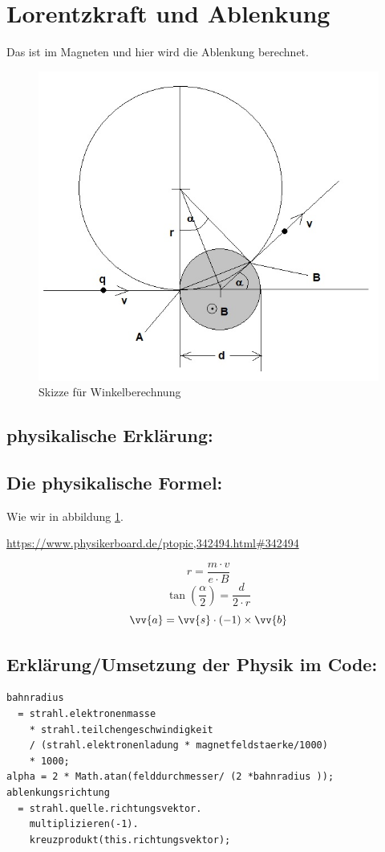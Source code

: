 \section{Lorentzkraft und Ablenkung}

Das ist im Magneten und hier wird die Ablenkung berechnet.
\begin{figure}
    \centering
    \includegraphics[width=.75\textwidth]{fig/elektronenstrahl-ablenkung_101.jpg}
    \caption{Skizze für Winkelberechnung}
    \label{fig:ausBlock}
\end{figure}

\subsection{physikalische Erklärung:}
\subsection{Die physikalische Formel:}
Wie wir in abbildung \ref{fig:ausBlock}.

\url{https://www.physikerboard.de/ptopic,342494.html#342494}

$$ r = \frac{m \cdot v}{e \cdot B}$$
$$ \tan(\frac{\alpha}{2}) = \frac{d}{2 \cdot r}$$
$$ \vv{a} = \vv{s} \cdot (-1) \times \vv{b}$$

\subsection{Erklärung/Umsetzung der Physik im Code:}
\begin{lstlisting}
bahnradius
  = strahl.elektronenmasse
    * strahl.teilchengeschwindigkeit
    / (strahl.elektronenladung * magnetfeldstaerke/1000)
    * 1000;
alpha = 2 * Math.atan(felddurchmesser/ (2 *bahnradius ));
ablenkungsrichtung
  = strahl.quelle.richtungsvektor.
    multiplizieren(-1).
    kreuzprodukt(this.richtungsvektor);
\end{lstlisting}

